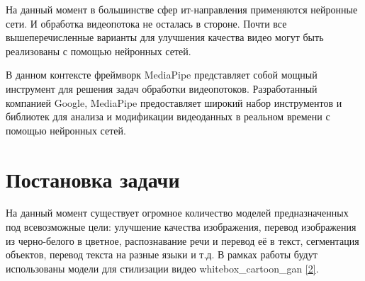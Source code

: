\documentclass[a4paper,14pt]{extreport}
\begin{document}
    На данный момент в большинстве сфер ит-направления применяются нейронные сети. И обработка видеопотока не осталась в стороне. Почти все вышеперечисленные варианты для улучшения качества видео могут быть реализованы с помощью нейронных сетей.

    В данном контексте фреймворк MediaPipe представляет собой мощный инструмент для решения задач обработки видеопотоков. Разработанный компанией Google, MediaPipe предоставляет широкий набор инструментов и библиотек для анализа и модификации видеоданных в реальном времени с помощью нейронных сетей.

    \chapter{Постановка задачи}
    На данный момент существует огромное количество моделей предназначенных под всевозможные цели: улучшение качества изображения, перевод изображения из черно-белого в цветное, распознавание речи и перевод её в текст, сегментация объектов, перевод текста на разные языки и т.д. В рамках работы будут использованы модели для стилизации видео whitebox\_cartoon\_gan \hyperlink{[2]}{[2]}.
\end{document}
